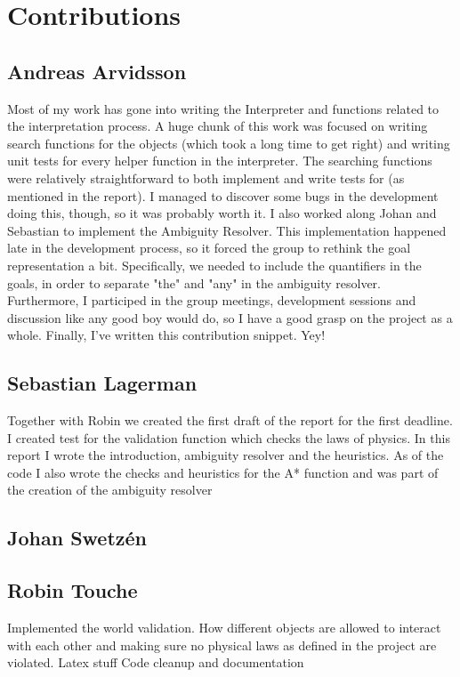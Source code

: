 \section*{Contributions}
\subsection*{Andreas Arvidsson}
Most of my work has gone into writing the Interpreter and functions related to the interpretation process.
A huge chunk of this work was focused on writing search functions for the objects (which took a long time to get right) and writing unit tests for every helper function in the interpreter.
The searching functions were relatively straightforward to both implement and write tests for (as mentioned in the report).
I managed to discover some bugs in the development doing this, though, so it was probably worth it.
\newline
\newline
I also worked along Johan and Sebastian to implement the Ambiguity Resolver. This implementation happened late in the development process, so it forced the group to rethink the goal representation a bit. Specifically, we needed to include the quantifiers in the goals, in order to separate "the" and "any" in the ambiguity resolver.
\newline
\newline
Furthermore, I participed in the group meetings, development sessions and discussion like any good boy would do, so I have a good grasp on the project as a whole.
\newline
\newline
Finally, I've written this contribution snippet. Yey!

\subsection*{Sebastian Lagerman}
Together with Robin we created the first draft of the report for the first deadline.
\newline
\newline
I created test for the validation function which checks the laws of physics.
\newline
\newline
In this report I wrote the introduction, ambiguity resolver and the heuristics.
\newline
\newline
As of the code I also wrote the checks and heuristics for the A* function and was part of the creation of the ambiguity resolver

\subsection*{Johan Swetz\'en}
\subsection*{Robin Touche}
Implemented the world validation.
How different objects are allowed to interact with each other and making sure no physical laws as defined in the project are violated.
Latex stuff
Code cleanup and documentation
